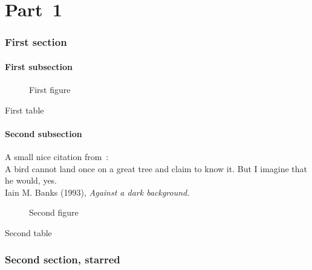\documentclass[oneside,12pt,a4paper]{article}
\begin{document}
\doparttoc \dopartlof \dopartlot
\dosecttoc \dosectlof \dosectlot
\setcounter{tocdepth}{6}
\setcounter{parttocdepth}{6}
\setcounter{secttocdepth}{6}
\tableofcontents
\mtcaddsection
\listoffigures
\mtcaddsection
\listoftables
\mtcaddsection
\part{Part~1}
\parttoc \mtcskip \partlof \mtcskip \partlot

\section{First section}
\secttoc \mtcskip \sectlof \mtcskip \sectlot
\subsection{First subsection}

\begin{figure}[tp]
\caption{First figure}
\end{figure}
\begin{table}[tp]
\caption{First table}
\end{table}

\subsection{Second subsection}
A small nice citation from~\cite{dark}:\\
%
%
%
%
%
%
A bird cannot land once on a great tree and claim to know it.
But I imagine that he would, yes.\\
\hbox{}\hfill Iain M. Banks (1993), \textsl{Against a dark background.}%
%
\begin{figure}[tp]
\caption{Second figure}
\end{figure}
\begin{table}
\caption{Second table}
\end{table}
\section*{Second section, starred}
\end{document}
